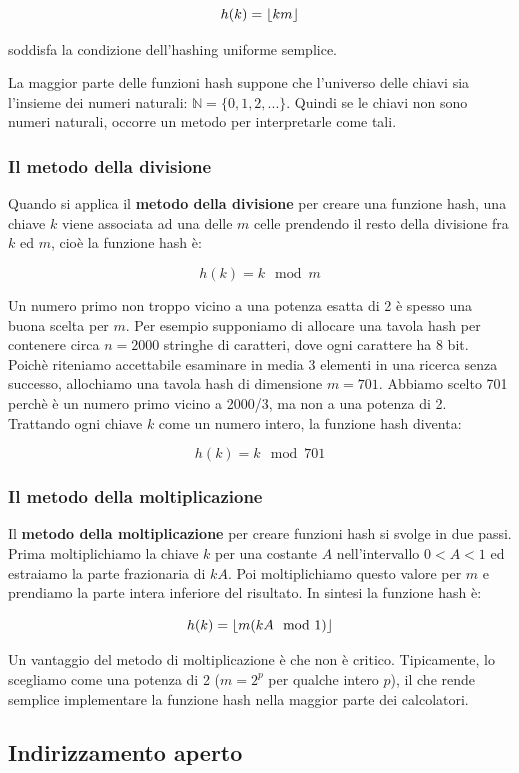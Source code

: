 $$h(k)=\floor*{km}$$

soddisfa la condizione dell'hashing uniforme semplice.

La maggior parte delle funzioni hash suppone che l'universo delle chiavi sia l'insieme dei numeri naturali: $\mathbb{N}=\{0,1,2,...\}$. Quindi se le chiavi non sono numeri naturali, occorre un metodo per interpretarle come tali.

\subsubsection{Il metodo della divisione}

Quando si applica il \textbf{metodo della divisione} per creare una funzione hash, una chiave $k$ viene associata ad una delle $m$ celle prendendo il resto della divisione fra $k$ ed $m$, cioè la funzione hash è:

$$h(k)=k\mod m$$

Un numero primo non troppo vicino a una potenza esatta di 2 è spesso una buona scelta per $m$. Per esempio supponiamo di allocare una tavola hash per contenere circa $n=2000$ stringhe di caratteri, dove ogni carattere ha 8 bit. Poichè riteniamo accettabile esaminare in media 3 elementi in una ricerca senza successo, allochiamo una tavola hash di dimensione $m=701$. Abbiamo scelto 701 perchè è un numero primo vicino a 2000/3, ma non a una potenza di 2. Trattando ogni chiave $k$ come un numero intero, la funzione hash diventa:

$$h(k)=k\mod 701$$

\subsubsection{Il metodo della moltiplicazione}

Il \textbf{metodo della moltiplicazione} per creare funzioni hash si svolge in due passi. Prima moltiplichiamo la chiave $k$ per una costante $A$ nell'intervallo $0<A<1$ ed estraiamo la parte frazionaria di $kA$. Poi moltiplichiamo questo valore per $m$ e prendiamo la parte intera inferiore del risultato. In sintesi la funzione hash è:

$$h(k)=\floor*{m(kA\mod 1)}$$

Un vantaggio del metodo di moltiplicazione è che non è critico. Tipicamente, lo scegliamo come una potenza di 2 ($m=2^p$ per qualche intero $p$), il che rende semplice implementare la funzione hash nella maggior parte dei calcolatori.

\subsection{Indirizzamento aperto}


